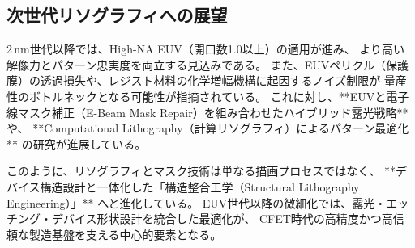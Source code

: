\subsection{次世代リソグラフィへの展望}
2\,nm世代以降では、High-NA EUV（開口数1.0以上）の適用が進み、  
より高い解像力とパターン忠実度を両立する見込みである。  
また、EUVペリクル（保護膜）の透過損失や、レジスト材料の化学増幅機構に起因するノイズ制限が  
量産性のボトルネックとなる可能性が指摘されている。  
これに対し、**EUVと電子線マスク補正（E-Beam Mask Repair）を組み合わせたハイブリッド露光戦略** や、  
**Computational Lithography（計算リソグラフィ）によるパターン最適化** の研究が進展している。

このように、リソグラフィとマスク技術は単なる描画プロセスではなく、  
**デバイス構造設計と一体化した「構造整合工学（Structural Lithography Engineering）」** へと進化している。  
EUV世代以降の微細化では、露光・エッチング・デバイス形状設計を統合した最適化が、  
CFET時代の高精度かつ高信頼な製造基盤を支える中心的要素となる。
